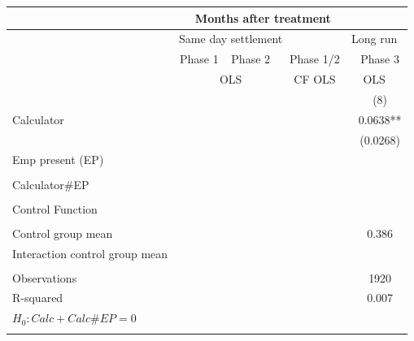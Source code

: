 \begin{tabular}{lcccccccc}
\toprule
\multicolumn{1}{|r}{} & \multicolumn{7}{c}{Months after treatment}            &  \\
\midrule
\multicolumn{1}{r|}{} & \multicolumn{5}{c}{Same day settlement} & \multicolumn{1}{c|}{} & \multicolumn{2}{c}{Long run} \\
\midrule
\midrule
\multicolumn{1}{r|}{} & \multicolumn{2}{c|}{Phase 1} & \multicolumn{2}{c|}{Phase 2} & \multicolumn{3}{c|}{Phase 1/2} & Phase 3 \\
\midrule
\multicolumn{1}{r|}{} & \multicolumn{5}{c|}{OLS}              & \multicolumn{1}{c|}{CF OLS} & \multicolumn{2}{c}{OLS} \\
\midrule
\midrule
      &       &       &       &       &       &       &       & (8) \\
Calculator  &       &       &       &       &       &       &       & 0.0638** \\
      &       &       &       &       &       &       &       & (0.0268) \\
Emp present (EP) &       &       &       &       &       &       &       &  \\
      &       &       &       &       &       &       &       &  \\
Calculator\#EP &       &       &       &       &       &       &       &  \\
      &       &       &       &       &       &       &       &  \\
Control Function &       &       &       &       &       &       &       &  \\
      &       &       &       &       &       &       &       &  \\
\midrule
Control group mean &       &       &       &       &       &       &       & 0.386 \\
Interaction control group mean &       &       &       &       &       &       &       &  \\
\midrule
      &       &       &       &       &       &       &       &  \\
\midrule
Observations &       &       &       &       &       &       &       & 1920 \\
R-squared &       &       &       &       &       &       &       & 0.007 \\
$H_0 : Calc + Calc\# EP = 0$ &       &       &       &       &       &       &       &  \\
\midrule
\midrule
      &       &       &       &       &       &       &       &  \\
\midrule
\midrule
\end{tabular}%
